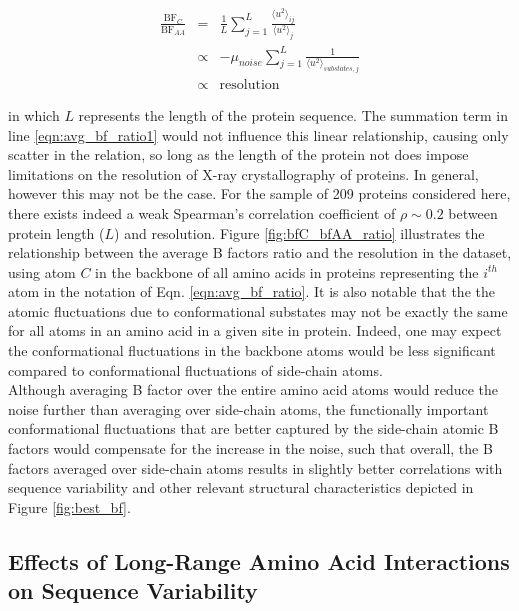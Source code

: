 \documentclass[11pt]{article}
\begin{document}
    \begin{eqnarray}
        \frac{\text{BF}_C}{\text{BF}_{AA}} &=& \frac{1}{L}\sum_{j=1}^{L}\frac{\langle u^2 \rangle_{ij}}{\langle u^2 \rangle_{j}} \label{eqn:avg_bf_ratio} \\
                                           &\propto& -\mu_{noise} \sum_{j=1}^{L}\frac{1}{\langle u^2 \rangle_{substates,j}} \label{eqn:avg_bf_ratio1} \\
                                           &\propto& \text{resolution}
    \end {eqnarray}

    \noindent in which $L$ represents the length of the protein sequence. The summation term in line \ref{eqn:avg_bf_ratio1} would not influence this linear relationship, causing only scatter in the relation, so long as the length of the protein not does impose limitations on the resolution of X-ray crystallography of proteins. In general, however this may not be the case. For the sample of 209 proteins considered here, there exists indeed a weak Spearman's correlation coefficient of $\rho\sim0.2$ between protein length ($L$) and resolution. Figure \ref{fig:bfC_bfAA_ratio} illustrates the relationship between the average B factors ratio and the resolution in the dataset, using atom $C$ in the backbone of all amino acids in proteins representing the $i^{th}$ atom in the notation of Eqn. \ref{eqn:avg_bf_ratio}. It is also notable that the the atomic fluctuations due to conformational substates may not be exactly the same for all atoms in an amino acid in a given site in protein. Indeed, one may expect the conformational fluctuations in the backbone atoms would be less significant compared to conformational fluctuations of side-chain atoms. \\

    Although averaging B factor over the entire amino acid atoms would reduce the noise further than averaging over side-chain atoms, the functionally important conformational fluctuations that are better captured by the side-chain atomic B factors would compensate for the increase in the noise, such that overall, the B factors averaged over side-chain atoms results in slightly better correlations with sequence variability and other relevant structural characteristics depicted in Figure \ref{fig:best_bf}. \\

    \subsection*{Effects of Long-Range Amino Acid Interactions on Sequence Variability}
\end{document}
